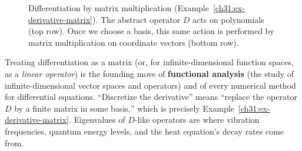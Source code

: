 \begin{figure}[htbp]
\centering
{}
\caption{Differentiation by matrix multiplication (Example~\ref{ch31:ex-derivative-matrix}). The abstract operator $D$ acts on polynomials (top row). Once we choose a basis, this same action is performed by matrix multiplication on coordinate vectors (bottom row).}
\label{ch31:fig-derivative-matrix}
\end{figure}


\begin{connectionbox}
Treating differentiation as a
matrix (or, for infinite-dimensional function spaces, as a \emph{linear
operator}) is the founding move of \textbf{functional analysis} (the study of infinite-dimensional vector spaces and operators) and of every
numerical method for differential equations. ``Discretize the derivative'' means
``replace the operator $D$ by a finite matrix in some basis,'' which is precisely
Example~\ref{ch31:ex-derivative-matrix}. Eigenvalues of $D$-like operators are
where vibration frequencies, quantum energy levels, and the heat equation's decay
rates come from.
\end{connectionbox}

